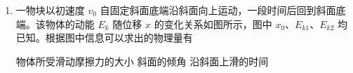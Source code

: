\documentclass[\gkver]{gaokaozhenti}
\begin{document}
\begin{enumerate}
{若开关接 ab 端，则负载得到的功率

$P_{\text{负载}}^{\prime}=\frac{U_{0}^{2}}{\left(R_{\text{导线}}+R_{\text{负载}}\right)^{2}}\cdot R_{\text{负载}}$

输电线上损耗的电功率为

$P_{\text{导线}}^{\prime}=\frac{U_{0}^{2}}{\left(R_{\text{导线}}+R_{\text{负载}}\right)^{2}}R_{\text{导线}}$

将 $R_{\text{导线}}=R_{1}=R_{2}=20\UO$，$R_{\text{负载}}=\frac{6^{2}}{1.8}\UO=20\UO$，$k=3$ 带入可知：

可得 $P_{\text{负载}} > P_{\text{负载}}^{\prime}$

即 $L_{2}$ 比 $L_{1}$ 更亮；

$P_{\text{导线}} < P_{\text{导线}}^{\prime}$

$R_{1}$ 上消耗的功率比 $R_{2}$ 的大。

故选 BC。
}

\item
一物块以初速度 $v_{0}$ 自固定斜面底端沿斜面向上运动，一段时间后回到斜面底端。该物体的动能 $E_{k}$ 随位移 $x$ 的变化关系如图所示，图中 $x_{0}$、$E_{k1}$、$E_{k2}$ 均已知。根据图中信息可以求出的物理量有


{物体所受滑动摩擦力的大小}
{斜面的倾角}
{沿斜面上滑的时间}

\end{enumerate}
\end{document}
